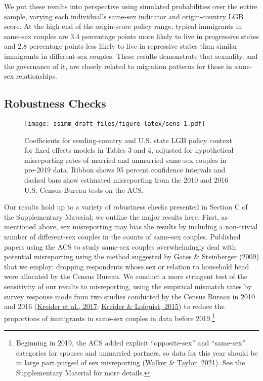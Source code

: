 \documentclass[
  11pt,
]{article}
\begin{document}
We put these results into perspective using simulated probabilities over the entire sample, varying each individual's same-sex indicator and origin-country LGB score. At the high end of the origin-score policy range, typical immigrants in same-sex couples are 3.4 percentage points more likely to live in progressive states and 2.8 percentage points less likely to live in repressive states than similar immigrants in different-sex couples. These results demonstrate that sexuality, and the governance of it, are closely related to migration patterns for those in same-sex relationships.

\hypertarget{robustness-checks}{%
\subsection{Robustness Checks}\label{robustness-checks}}

\begin{figure}
\centering
\texttt{[image: ssimm\_draft\_files/figure-latex/sens-1.pdf]}
\caption{\label{fig:sens}Coefficients for sending-country and U.S. state LGB policy context for fixed effects models in Tables 3 and 4, adjusted for hypothetical misreporting rates of married and unmarried same-sex couples in pre-2019 data. Ribbon shows 95 percent confidence intervals and dashed bars show estimated misreporting from the 2010 and 2016 U.S. Census Bureau tests on the ACS.}
\end{figure}

Our results hold up to a variety of robustness checks presented in Section C of the Supplementary Material; we outline the major results here. First, as mentioned above, sex misreporting may bias the results by including a non-trivial number of different-sex couples in the counts of same-sex couples. Published papers using the ACS to study same-sex couples overwhelmingly deal with potential misreporting using the method suggested by \protect\hyperlink{ref-gates_2009}{Gates \& Steinberger} (\protect\hyperlink{ref-gates_2009}{2009}) that we employ: dropping respondents whose sex or relation to household head were allocated by the Census Bureau. We conduct a more stringent test of the sensitivity of our results to misreporting, using the empirical mismatch rates by survey response mode from two studies conducted by the Census Bureau in 2010 and 2016 (\protect\hyperlink{ref-kreider_2017}{Kreider et al., 2017}; \protect\hyperlink{ref-kreider_2015}{Kreider \& Lofquist, 2015}) to reduce the proportions of immigrants in same-sex couples in data before 2019.\footnote{Beginning in 2019, the ACS added explicit ``opposite-sex'' and ``same-sex'' categories for spouses and unmarried partners, so data for this year should be in large part purged of sex misreporting (\protect\hyperlink{ref-walker_2021}{Walker \& Taylor, 2021}). See the Supplementary Material for more details.}
\end{document}
